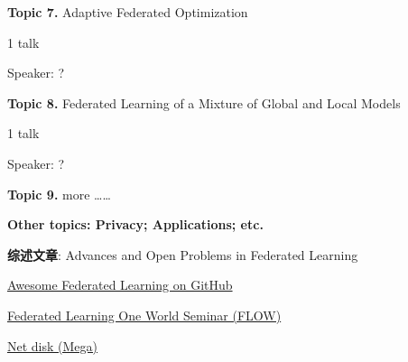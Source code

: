 {\bfseries \large Topic 7.} Adaptive Federated Optimization \cite{reddi2020fed_opt}

1 talk

Speaker: ?

\vspace{2em}

{\bfseries \large Topic 8.} Federated Learning of a Mixture of Global and Local Models \cite{hanzely2020federated}

1 talk

Speaker: ?

\vspace{2em}

{\bfseries \large Topic 9.} more \ldots\ldots

\vspace{3em}

{\bfseries \Large Other topics: Privacy; Applications; etc.}


\vspace{3em}


{\bfseries \Large 综述文章}: Advances and Open Problems in Federated Learning \cite{kairouz2019advances_fl}

\vspace{2em}

\href{https://github.com/chaoyanghe/Awesome-Federated-Learning}{Awesome Federated Learning on GitHub}

\vspace{2em}

\href{https://sites.google.com/view/one-world-seminar-series-flow/home}{Federated Learning One World Seminar (FLOW)}

\vspace{2em}

\href{https://mega.nz/folder/tNoiCbQR#_HgtoFiy4PYc4Uf8-9tYTQ}{Net disk (Mega)}




